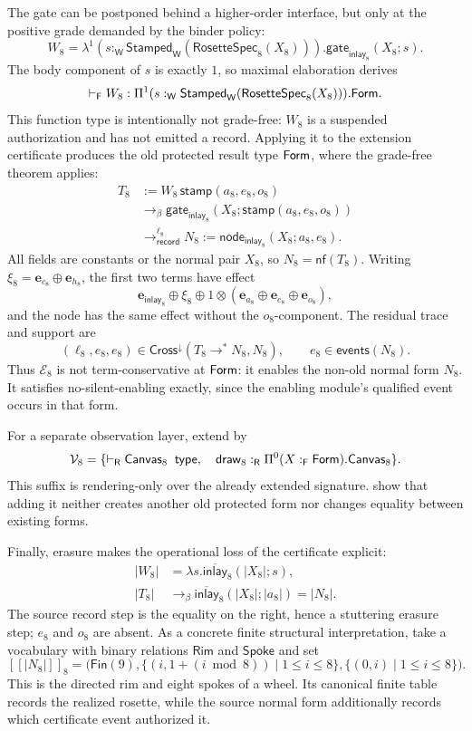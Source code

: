 \documentclass[11pt]{article}
\numberwithin{equation}{section}
\theoremstyle{definition}
\theoremstyle{plain}
\theoremstyle{remark}
\renewcommand{\Form}{\AFForm}
\newcommand{\Stamped}{\mathsf{Stamped}}
\newcommand{\Frm}{\mathsf F}
\newcommand{\Wit}{\mathsf W}
\newcommand{\Ren}{\mathsf R}
\newcommand{\events}{\mathsf{events}}
\newcommand{\nf}{\mathsf{nf}}
\newcommand{\unit}{\mathbf e}
\newcommand{\jtype}{\mathrel{\mathsf{type}}}
\newcommand{\cross}{\mathsf{Cross}}
\newcommand{\sem}[1]{\left\lbrack\!\left\lbrack #1\right\rbrack\!\right\rbrack}
\newcommand{\fin}{\mathsf{Fin}}
\begin{document}
The gate can be postponed behind a higher-order interface, but only at the
positive grade demanded by the binder policy:
\[
 W_8=
 \lambda^1(s:_{\Wit}\Stamped_\Wit(\mathsf{RosetteSpec}_8(X_8))).
 \mathsf{gate}_{\mathsf{inlay}_8}(X_8;s).
\]
The body component of \(s\) is exactly \(1\), so maximal elaboration derives
\[
 \vdash_{\Frm}W_8:
 \AFDepFun^1(s:_{\Wit}\Stamped_\Wit(\mathsf{RosetteSpec}_8(X_8))).
 \Form.
\]
This function type is intentionally not grade-free: \(W_8\) is a suspended
authorization and has not emitted a record.  Applying it to the extension
certificate produces the old protected result type \(\Form\), where the
grade-free theorem applies:
\begin{align*}
 T_8
 &:=W_8\,\mathsf{stamp}(a_8,e_8,o_8)\\
 &\longrightarrow_\beta
 \mathsf{gate}_{\mathsf{inlay}_8}
   (X_8;\mathsf{stamp}(a_8,e_8,o_8))\\
 &\longrightarrow_{\mathsf{record}}^{\ell_8}
 N_8:=\mathsf{node}_{\mathsf{inlay}_8}(X_8;a_8,e_8).
\end{align*}
All fields are constants or the normal pair \(X_8\), so \(N_8=\nf(T_8)\).
Writing \(\xi_8=\unit_{c_8}\oplus\unit_{h_8}\), the first two terms have
effect
\[
 \unit_{\mathsf{inlay}_8}\oplus\xi_8\oplus
 1\otimes(\unit_{a_8}\oplus\unit_{e_8}\oplus\unit_{o_8}),
\]
and the node has the same effect without the \(o_8\)-component.  The residual
trace and support are
\[
 (\ell_8,e_8,e_8)\in\cross^\downarrow(T_8\longrightarrow^*N_8,N_8),
 \qquad e_8\in\events(N_8).
\]
Thus \(\mathcal E_8\) is not term-conservative at \(\Form\): it enables the
non-old normal form \(N_8\).  It satisfies no-silent-enabling exactly, since
the enabling module's qualified event occurs in that form.

For a separate observation layer, extend by
\[
 \mathcal V_8=
 \{\vdash_{\Ren}\AFCanvas_8\;\jtype,
 \quad
 \mathsf{draw}_8:_{\Ren}
   \AFDepFun^0(X:_{\Frm}\Form).\AFCanvas_8\}.
\]
This suffix is rendering-only over the already extended signature.
 show that adding it neither creates
another old protected form nor changes equality between existing forms.

Finally, erasure makes the operational loss of the certificate explicit:
\begin{align*}
 |W_8|&=\lambda s.\overline{\mathsf{inlay}}_8(|X_8|;s),\\
 |T_8|&\longrightarrow_\beta
 \overline{\mathsf{inlay}}_8(|X_8|;|a_8|)
 =|N_8|.
\end{align*}
The source record step is the equality on the right, hence a stuttering
erasure step; \(e_8\) and \(o_8\) are absent.  As a concrete finite structural
interpretation, take a vocabulary with binary relations
\(\mathsf{Rim}\) and \(\mathsf{Spoke}\) and set
\[
 \sem{|N_8|}_{8}=
 \bigl(\fin(9),
   \{(i,1+(i\bmod 8))\mid1\le i\le8\},
   \{(0,i)\mid1\le i\le8\}\bigr).
\]
This is the directed rim and eight spokes of a wheel.  Its canonical finite
table records the realized rosette, while the source normal form additionally
records which certificate event authorized it.
\end{document}
